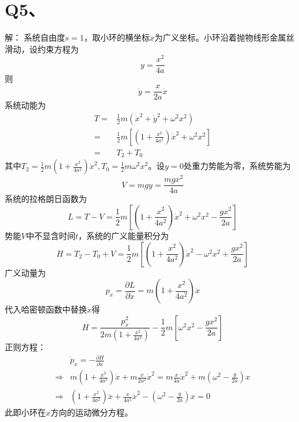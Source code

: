 \documentclass[10pt,a4paper]{article}
\begin{document}
\section*{Q5、}解：
系统自由度$s=1$，取小环的横坐标$x$为广义坐标。小环沿着抛物线形金属丝滑动，设约束方程为
\[
y=\frac{x^2}{4a}
\]
则
\[
\dot{y}=\frac{x}{2a}\dot{x}
\]
系统动能为
\begin{align*}
T=&\frac{1}{2}m(\dot{x}^2+\dot{y}^2+\omega^2x^2)\\
=&\frac{1}{2}m[(1+\frac{x^2}{4a^2})\dot{x}^2+\omega^2x^2]\\
=&T_2+T_0
\end{align*}
其中$T_2=\frac{1}{2}m(1+\frac{x^2}{4a^2})\dot{x}^2, T_0=\frac{1}{2}m\omega^2x^2$。设$y=0$处重力势能为零，系统势能为
\[
V=mgy=\frac{mgx^2}{4a}
\]
系统的拉格朗日函数为
\[
L=T-V=\frac{1}{2}m[(1+\frac{x^2}{4a^2})\dot{x}^2+\omega^2x^2-\frac{gx^2}{2a}]
\]
势能$V$中不显含时间$t$，系统的广义能量积分为
\[
H=T_2-T_0+V=\frac{1}{2}m[(1+\frac{x^2}{4a^2})\dot{x}^2-\omega^2x^2+\frac{gx^2}{2a}]
\]
广义动量为
\[
p_x=\frac{\partial L}{\partial\dot{x}}=m(1+\frac{x^2}{4a^2})\dot{x}
\]
代入哈密顿函数中替换$\dot{x}$得
\[
H=\frac{p_x^2}{2m(1+\frac{x^2}{4a^2})}-\frac{1}{2}m[\omega^2x^2-\frac{gx^2}{2a}]
\]
正则方程：
\begin{align*}
&\dot{p}_x=-\frac{\partial H}{\partial x}\\
\Longrightarrow&m(1+\frac{x^2}{4a^2})\ddot{x}+m\frac{x}{2a^2}\dot{x}^2=m\frac{x}{4a}\dot{x}^2+m(\omega^2-\frac{g}{2a})x\\
\Longrightarrow&(1+\frac{x^2}{4a^2})\ddot{x}+\frac{x}{4a^2}\dot{x}^2-(\omega^2-\frac{g}{2a})x=0
\end{align*}
此即小环在$x$方向的运动微分方程。
\end{document}
